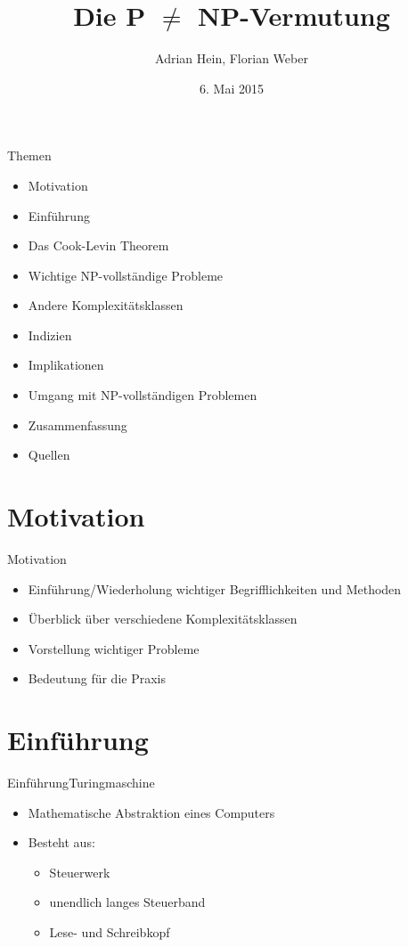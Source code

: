 \documentclass[ignorenonframetext,]{beamer}
\title{Die P $\neq$ NP-Vermutung}
\author{Adrian Hein, Florian Weber}
\date{6. Mai 2015}
\begin{document}
\frame{\titlepage}

\begin{frame}{Themen}

\begin{itemize}
	\item Motivation
	\item Einführung
	\item Das Cook-Levin Theorem
	\item Wichtige NP-vollständige Probleme
	\item Andere Komplexitätsklassen
	\item Indizien
	\item Implikationen
	\item Umgang mit NP-vollständigen Problemen
	\item Zusammenfassung
	\item Quellen
\end{itemize}
\end{frame}

\section{Motivation}

\begin{frame}{Motivation}

\begin{itemize}
\itemsep1pt\parskip0pt
\item
  Einführung/Wiederholung wichtiger Begrifflichkeiten und Methoden
\item
  Überblick über verschiedene Komplexitätsklassen
\item
  Vorstellung wichtiger Probleme
\item
  Bedeutung für die Praxis
\end{itemize}

\end{frame}


\section{Einführung}\label{einfuxfchrung}

\begin{frame}{Einführung}{Turingmaschine}

\begin{itemize}
\itemsep1pt\parskip0pt
\item
  Mathematische Abstraktion eines Computers
\item
  Besteht aus:

  \begin{itemize}
  \itemsep1pt\parskip0pt
  \item
    Steuerwerk
  \item
    unendlich langes Steuerband
  \item
    Lese- und Schreibkopf
  \end{itemize}
\end{itemize}

\end{frame}
\end{document}
